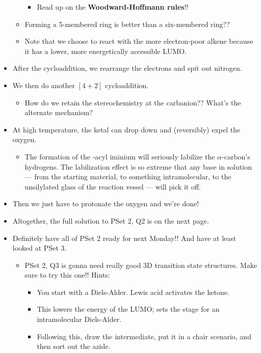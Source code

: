 \documentclass[../notes.tex]{subfiles}
\begin{document}
\begin{itemize}
\begin{itemize}
\begin{itemize}
            \item Read up on the \textbf{Woodward-Hoffmann rules}!!
        \end{itemize}
        \item Forming a 5-membered ring is better than a six-membered ring??
        \item Note that we choose to react with the more electron-poor alkene because it has a lower, more energetically accessible LUMO.
    \end{itemize}
    \item After the cycloaddition, we rearrange the electrons and spit out nitrogen.
    \item We then do another $[4+2]$ cycloaddition.
    \begin{itemize}
        \item How do we retain the stereochemistry at the carbanion?? What's the alternate mechanism?
    \end{itemize}
    \item At high temperature, the  ketal can drop down and (reversibly) expel the oxygen.
    \begin{itemize}
        \item The formation of the -acyl iminium will seriously labilize the $\alpha$-carbon's hydrogens. The labilization effect is so extreme that any base in solution --- from the starting material, to something intramolecular, to the unsilylated glass of the reaction vessel --- will pick it off.
    \end{itemize}
    \item Then we just have to protonate the oxygen and we're done!
    \item Altogether, the full solution to PSet 2, Q2 is on the next page.
    
    \item Definitely have all of PSet 2 ready for next Monday!! And have at least looked at PSet 3.
    \begin{itemize}
        \item PSet 2, Q3 is gonna need really good 3D transition state structures. Make sure to try this one!! Hints:
        \begin{itemize}
            \item You start with a Diels-Alder. Lewis acid activates the ketone.
            \item This lowers the energy of the LUMO; sets the stage for an intramolecular Diels-Alder.
            \item Following this, draw the intermediate, put it in a chair scenario, and then sort out the azide.

\end{itemize}
\end{itemize}
\end{itemize}
\end{document}

